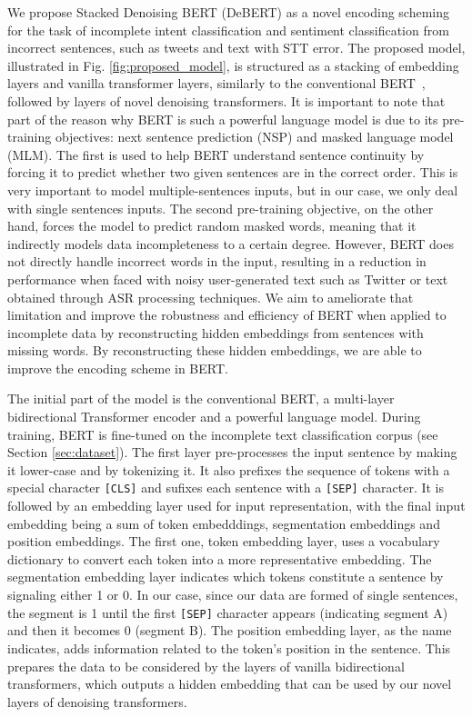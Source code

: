 \documentclass[review]{elsarticle}
\begin{document}
We propose Stacked Denoising BERT (DeBERT) as a novel encoding scheming for the task of incomplete intent classification and sentiment classification from incorrect sentences, such as tweets and text with STT error. The proposed model, illustrated in Fig. \ref{fig:proposed_model}, is structured as a stacking of embedding layers and vanilla transformer layers, similarly to the conventional BERT~\citep{devlin2018bert}, followed by layers of novel denoising transformers. It is important to note that part of the reason why BERT is such a powerful language model is due to its pre-training objectives: next sentence prediction (NSP) and masked language model (MLM). The first is used to help BERT understand sentence continuity by forcing it to predict whether two given sentences are in the correct order. This is very important to model multiple-sentences inputs, but in our case, we only deal with single sentences inputs. The second pre-training objective, on the other hand, forces the model to predict random masked words, meaning that it indirectly models data incompleteness to a certain degree. However, BERT does not directly handle incorrect words in the input, resulting in a reduction in performance when faced with noisy user-generated text such as Twitter or text obtained through ASR processing techniques. We aim to ameliorate that limitation and improve the robustness and efficiency of BERT when applied to incomplete data by reconstructing hidden embeddings from sentences with missing words. By reconstructing these hidden embeddings, we are able to improve the encoding scheme in BERT.

The initial part of the model is the conventional BERT, a multi-layer bidirectional Transformer encoder and a powerful language model. During training, BERT is fine-tuned on the incomplete text classification corpus (see Section \ref{sec:dataset}). The first layer pre-processes the input sentence by making it lower-case and by tokenizing it. It also prefixes the sequence of tokens with a special character \texttt{[CLS]} and sufixes each sentence with a \texttt{[SEP]} character. It is followed by an embedding layer used for input representation, with the final input embedding being a sum of token embedddings, segmentation embeddings and position embeddings. The first one, token embedding layer, uses a vocabulary dictionary to convert each token into a more representative embedding. The segmentation embedding layer indicates which tokens constitute a sentence by signaling either 1 or 0. In our case, since our data are formed of single sentences, the segment is 1 until the first \texttt{[SEP]} character appears (indicating segment A) and then it becomes 0 (segment B). The position embedding layer, as the name indicates, adds information related to the token's position in the sentence. This prepares the data to be considered by the layers of vanilla bidirectional transformers, which outputs a hidden embedding that can be used by our novel layers of denoising transformers.
\end{document}
